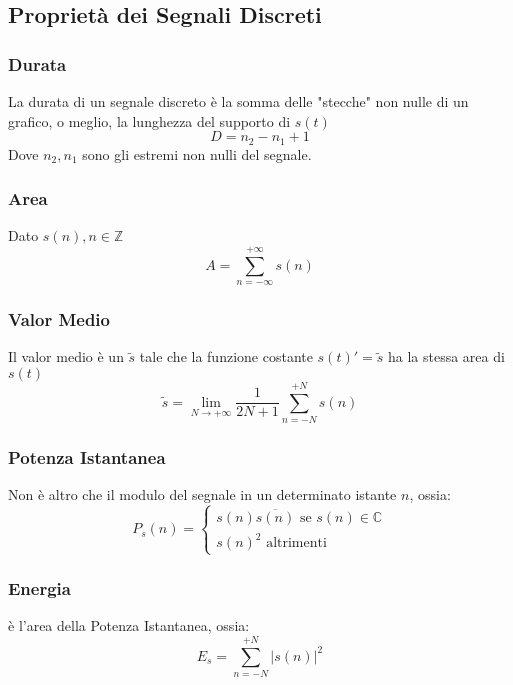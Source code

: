 \subsection{Proprietà dei Segnali Discreti}
\subsubsection{Durata}
La durata di un segnale discreto è la somma delle "stecche" non nulle di un grafico, o meglio, la lunghezza del supporto di $s(t)$
\begin{equation}
    D = n_2 - n_1 + 1
\end{equation}
Dove $n_2,n_1$ sono gli estremi non nulli del segnale.

\subsubsection{Area}
Dato $s(n), n \in \mathbb{Z}$
\begin{equation}
    A = \sum_{n = -\infty}^{+\infty} s(n)
\end{equation}

\subsubsection{Valor Medio}
Il valor medio è un $\tilde{s}$ tale che la funzione costante $s(t)' = \tilde{s}$ ha la stessa area di $s(t)$
\begin{equation}
    \tilde{s} = \lim_{N \rightarrow +\infty} \frac{1}{2N + 1} \sum_{n=-N}^{+N} s(n)
\end{equation}

\subsubsection{Potenza Istantanea}
Non è altro che il modulo del segnale in un determinato istante $n$, ossia:
\begin{equation}
    P_s(n) = \begin{cases}
        s(n)\overline{s(n)} \mbox{ se } s(n) \in \mathbb{C} \\
        s(n)^2 \mbox{ altrimenti}
    \end{cases}
\end{equation}

\subsubsection{Energia}
è l'area della Potenza Istantanea, ossia:
\begin{equation}
    E_s = \sum_{n=-N}^{+N} |s(n)|^2
\end{equation}

